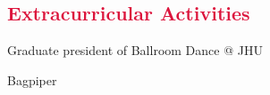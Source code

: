 \documentclass[margin, 10pt]{res} %
\let\oldsection\section
\renewcommand{\section}[1]{\oldsection{\textcolor{crimson}{#1}}}
\begin{document}
\begin{resume}
\section{Extracurricular Activities} 
\begin{description}
\item Graduate president of  Ballroom Dance @ JHU
\item Bagpiper
\end{description}







\end{resume}
\end{document}
